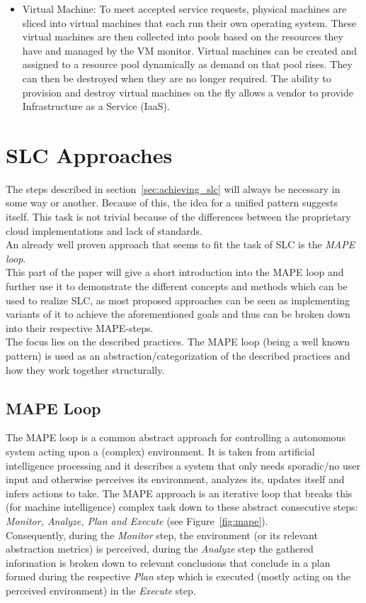 \documentclass[a4paper]{llncs}
\begin{document}
\begin{itemize}
	\item Virtual Machine: To meet accepted service requests, physical machines are sliced into virtual machines that each run their own operating system. These virtual machines are then collected into pools based on the resources they have and managed by the VM monitor. Virtual machines can be created and assigned to a resource pool dynamically as demand on that pool rises. They can then be destroyed when they are no longer required. The ability to provision and destroy virtual machines on the fly allows a vendor to provide Infrastructure as a Service (IaaS).\\
	\end{itemize}

\section{SLC Approaches}
The steps described in section~\ref{sec:achieving_slc} will always be necessary in some way or another. Because of this, the idea for a unified pattern suggests itself. This task is not trivial because of the differences between the proprietary cloud implementations and lack of standards.\\

An already well proven approach that seems to fit the task of SLC is the \textit{MAPE loop}.\\
This part of the paper will give a short introduction into the MAPE loop and further use it to demonstrate the different concepts and methods which can be used to realize SLC, as most proposed approaches can be seen as implementing variants of it to achieve the aforementioned goals and thus can be broken down into their respective MAPE-steps.\\
The focus lies on the described practices. The MAPE loop (being a well known pattern) is used as an abstraction/categorization of the described practices and how they work together structurally.

\subsection{MAPE Loop}
The MAPE loop is a common abstract approach for controlling a autonomous system acting upon a (complex) environment. It is taken from artificial intelligence processing and it describes a system that only needs sporadic/no user input and otherwise perceives its environment, analyzes its, updates itself and infers actions to take. The MAPE approach is an iterative loop that breaks this (for machine intelligence) complex task down to these abstract consecutive steps: \textit{Monitor, Analyze, Plan and Execute} (see Figure~\ref{fig:mape}).\\
Consequently, during the \textit{Monitor} step, the environment (or its relevant abstraction metrics) is perceived, during the \textit{Analyze} step the gathered information is broken down to relevant conclusions that conclude in a plan formed during the respective \textit{Plan} step which is executed (mostly acting on the perceived environment) in the \textit{Execute} step.\\
\end{document}
